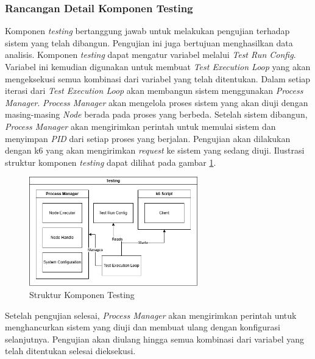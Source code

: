 \subsubsection{Rancangan Detail Komponen Testing}
\label{subsubsection:detail-data-testing}

Komponen \textit{testing} bertanggung jawab untuk melakukan pengujian terhadap sistem yang telah dibangun. Pengujian ini juga bertujuan menghasilkan data analisis. Komponen \textit{testing} dapat mengatur variabel melalui \textit{Test Run Config}. Variabel ini kemudian digunakan untuk membuat \textit{Test Execution Loop} yang akan mengeksekusi semua kombinasi dari variabel yang telah ditentukan. Dalam setiap iterasi dari \textit{Test Execution Loop} akan membangun sistem menggunakan \textit{Process Manager}. \textit{Process Manager} akan mengelola proses sistem yang akan diuji dengan masing-masing \textit{Node} berada pada proses yang berbeda. Setelah sistem dibangun, \textit{Process Manager} akan mengirimkan perintah untuk memulai sistem dan menyimpan \textit{PID} dari setiap proses yang berjalan. Pengujian akan dilakukan dengan k6 yang akan mengirimkan \textit{request} ke sistem yang sedang diuji. Ilustrasi struktur komponen \textit{testing} dapat dilihat pada gambar \ref{fig:testing-structure}.

\begin{figure}[ht]
    \centering
    \includegraphics[width=0.65\textwidth]{resources/chapter-3/testing-architecture.png}
    \caption{Struktur Komponen Testing}
    \label{fig:testing-structure}
\end{figure}

Setelah pengujian selesai, \textit{Process Manager} akan mengirimkan perintah untuk menghancurkan sistem yang diuji dan membuat ulang dengan konfigurasi selanjutnya. Pengujian akan diulang hingga semua kombinasi dari variabel yang telah ditentukan selesai dieksekusi.